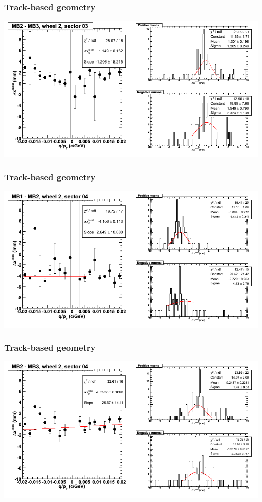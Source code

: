 \documentclass[compress]{beamer}
\begin{document}
\begin{frame}
\frametitle{Track-based geometry}
\includegraphics[width=\linewidth]{NOV4_segdiffs/dt13_resid_E_03_23.png}
\end{frame}

\begin{frame}
\frametitle{Track-based geometry}
\includegraphics[width=\linewidth]{NOV4_segdiffs/dt13_resid_E_04_12.png}
\end{frame}

\begin{frame}
\frametitle{Track-based geometry}
\includegraphics[width=\linewidth]{NOV4_segdiffs/dt13_resid_E_04_23.png}
\end{frame}
\end{document}
